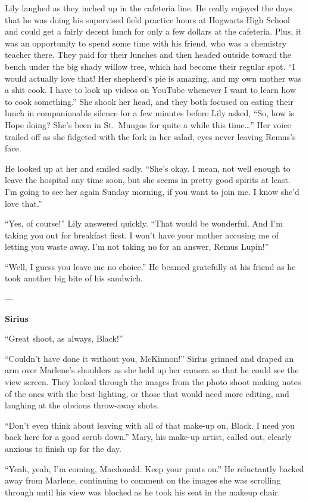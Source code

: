 \documentclass[12pt,twoside,openright]{memoir}
\begin{document}
Lily laughed as they inched up in the cafeteria line. He really enjoyed the days that he was doing his supervised field practice hours at Hogwarts High School and could get a fairly decent lunch for only a few dollars at the cafeteria. Plus, it was an opportunity to spend some time with his friend, who was a chemistry teacher there. They paid for their lunches and then headed outside toward the bench under the big shady willow tree, which had become their regular spot.
``I would actually love that! Her shepherd's pie is amazing, and my own mother was a shit cook. I have to look up videos on YouTube whenever I want to learn how to cook something.'' She shook her head, and they both focused on eating their lunch in companionable silence for a few minutes before Lily asked, ``So, how is Hope doing? She's been in St.\ Mungos for quite a while this time…'' Her voice trailed off as she fidgeted with the fork in her salad, eyes never leaving Remus's face. 

He looked up at her and smiled sadly. ``She's okay. I mean, not well enough to leave the hospital any time soon, but she seems in pretty good spirits at least. I'm going to see her again Sunday morning, if you want to join me. I know she'd love that.''

``Yes, of course!'' Lily answered quickly. ``That would be wonderful. And I'm taking you out for breakfast first. I won't have your mother accusing me of letting you waste away. I'm not taking no for an answer, Remus Lupin!'' 

``Well, I guess you leave me no choice.'' He beamed gratefully at his friend as he took another big bite of his sandwich. 

---

\textbf{Sirius} 

``Great shoot, as always, Black!''

``Couldn't have done it without you, McKinnon!'' Sirius grinned and draped an arm over Marlene's shoulders as she held up her camera so that he could see the view screen. They looked through the images from the photo shoot making notes of the ones with the best lighting, or those that would need more editing, and laughing at the obvious throw-away shots. 

``Don't even think about leaving with all of that make-up on, Black. I need you back here for a good scrub down.'' Mary, his make-up artist, called out, clearly anxious to finish up for the day.

``Yeah, yeah, I'm coming, Macdonald. Keep your pants on.'' He reluctantly backed away from Marlene, continuing to comment on the images she was scrolling through until his view was blocked as he took his seat in the makeup chair. 
\end{document}

